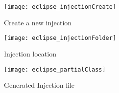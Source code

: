 \clearpage

\vspace*{3cm}

\begin{figure}[htbp]
    \centering
    \texttt{[image: eclipse\_injectionCreate]}
    \caption{Create a new injection}
    \label{fig:injection_create_injection}
\end{figure}

\clearpage
{}

\vspace*{0.5cm}

\begin{figure}[htbp]
    \centering
    \texttt{[image: eclipse\_injectionFolder]}
    \caption{Injection location}
    \label{fig:injection_folder}
\end{figure}

\vspace{2cm}

\begin{figure}[htbp]
    \centering
    \texttt{[image: eclipse\_partialClass]}
    \caption{Generated Injection file}
    \label{fig:injection_partialClass}
\end{figure}
